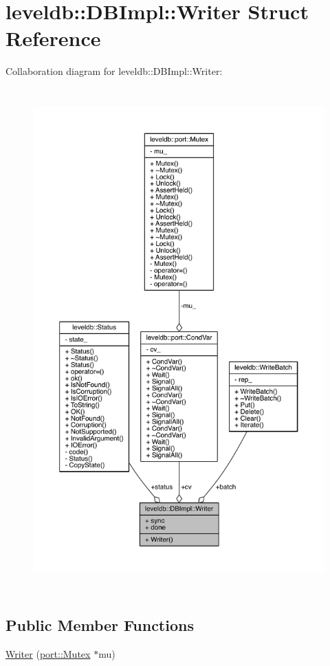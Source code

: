 \hypertarget{structleveldb_1_1_d_b_impl_1_1_writer}{}\section{leveldb\+:\+:D\+B\+Impl\+:\+:Writer Struct Reference}
\label{structleveldb_1_1_d_b_impl_1_1_writer}


Collaboration diagram for leveldb\+:\+:D\+B\+Impl\+:\+:Writer\+:\nopagebreak
\begin{figure}[H]
\begin{center}
\leavevmode
\includegraphics[height=550pt]{structleveldb_1_1_d_b_impl_1_1_writer__coll__graph}
\end{center}
\end{figure}
\subsection*{Public Member Functions}
\begin{DoxyCompactItemize}
\item 
\hyperlink{structleveldb_1_1_d_b_impl_1_1_writer_a7dfb43a804e1ded7a2a85b3bc756ea93}{Writer} (\hyperlink{classleveldb_1_1port_1_1_mutex}{port\+::\+Mutex} $\ast$mu)
\end{DoxyCompactItemize}
